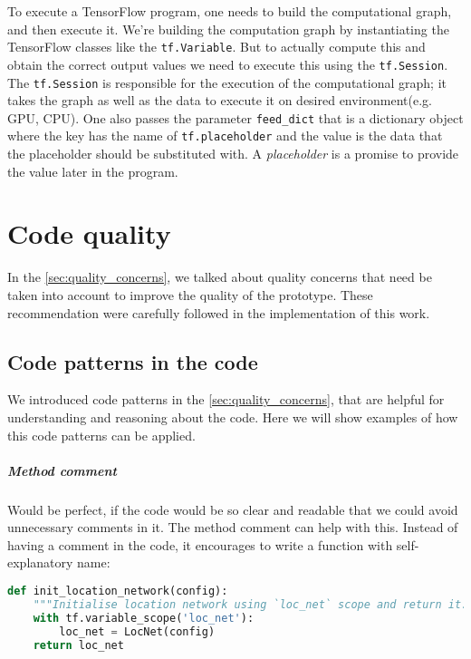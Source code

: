 To execute a TensorFlow program, one needs to build the computational graph,
and then execute it. We're building
the computation graph by instantiating the TensorFlow classes like the
\lstinline{tf.Variable}. But to actually compute this and obtain the correct output values
we need to execute this using the \lstinline{tf.Session}. The \lstinline{tf.Session}
is
responsible for the execution of the computational graph; it takes the graph
as well as the data
to execute it on desired environment(e.g. GPU, CPU). One also passes the parameter
\lstinline{feed_dict} that is a dictionary object where the key has the name of
\lstinline{tf.placeholder} and the value is the data that the placeholder should be substituted
with. A \emph{placeholder} is a promise to provide the value later in the program.


%

\section{Code quality}
In the \autoref{sec:quality_concerns}, we talked about quality concerns
that need be taken into account to improve the quality of the prototype.
These recommendation were carefully followed in the implementation of this work.

\subsection{Code patterns in the code} We introduced code patterns in the
\autoref{sec:quality_concerns}, that are
helpful for understanding and reasoning about the code. Here we will show
examples of how this code patterns can be applied.

\subparagraph{Method comment} Would be perfect, if the code would
be so clear and readable that we could avoid unnecessary comments in it.
The method comment can help with this. Instead of having a comment in the code,
it encourages to write a function with self-explanatory name:
\begin{lstlisting}[language=Python, caption={Method comment example},label={list:method_comment}]
def init_location_network(config):
    """Initialise location network using `loc_net` scope and return it."""
    with tf.variable_scope('loc_net'):
        loc_net = LocNet(config)
    return loc_net
\end{lstlisting}

